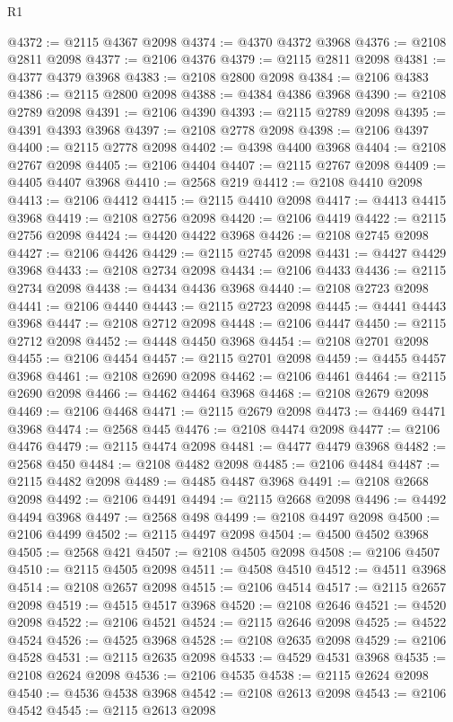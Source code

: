 \begin{lexlean}{R1}
\begin{coremodule}
@4372 := @2115 @4367 @2098
@4374 := @4370 @4372 @3968
@4376 := @2108 @2811 @2098
@4377 := @2106 @4376
@4379 := @2115 @2811 @2098
@4381 := @4377 @4379 @3968
@4383 := @2108 @2800 @2098
@4384 := @2106 @4383
@4386 := @2115 @2800 @2098
@4388 := @4384 @4386 @3968
@4390 := @2108 @2789 @2098
@4391 := @2106 @4390
@4393 := @2115 @2789 @2098
@4395 := @4391 @4393 @3968
@4397 := @2108 @2778 @2098
@4398 := @2106 @4397
@4400 := @2115 @2778 @2098
@4402 := @4398 @4400 @3968
@4404 := @2108 @2767 @2098
@4405 := @2106 @4404
@4407 := @2115 @2767 @2098
@4409 := @4405 @4407 @3968
@4410 := @2568 @219
@4412 := @2108 @4410 @2098
@4413 := @2106 @4412
@4415 := @2115 @4410 @2098
@4417 := @4413 @4415 @3968
@4419 := @2108 @2756 @2098
@4420 := @2106 @4419
@4422 := @2115 @2756 @2098
@4424 := @4420 @4422 @3968
@4426 := @2108 @2745 @2098
@4427 := @2106 @4426
@4429 := @2115 @2745 @2098
@4431 := @4427 @4429 @3968
@4433 := @2108 @2734 @2098
@4434 := @2106 @4433
@4436 := @2115 @2734 @2098
@4438 := @4434 @4436 @3968
@4440 := @2108 @2723 @2098
@4441 := @2106 @4440
@4443 := @2115 @2723 @2098
@4445 := @4441 @4443 @3968
@4447 := @2108 @2712 @2098
@4448 := @2106 @4447
@4450 := @2115 @2712 @2098
@4452 := @4448 @4450 @3968
@4454 := @2108 @2701 @2098
@4455 := @2106 @4454
@4457 := @2115 @2701 @2098
@4459 := @4455 @4457 @3968
@4461 := @2108 @2690 @2098
@4462 := @2106 @4461
@4464 := @2115 @2690 @2098
@4466 := @4462 @4464 @3968
@4468 := @2108 @2679 @2098
@4469 := @2106 @4468
@4471 := @2115 @2679 @2098
@4473 := @4469 @4471 @3968
@4474 := @2568 @445
@4476 := @2108 @4474 @2098
@4477 := @2106 @4476
@4479 := @2115 @4474 @2098
@4481 := @4477 @4479 @3968
@4482 := @2568 @450
@4484 := @2108 @4482 @2098
@4485 := @2106 @4484
@4487 := @2115 @4482 @2098
@4489 := @4485 @4487 @3968
@4491 := @2108 @2668 @2098
@4492 := @2106 @4491
@4494 := @2115 @2668 @2098
@4496 := @4492 @4494 @3968
@4497 := @2568 @498
@4499 := @2108 @4497 @2098
@4500 := @2106 @4499
@4502 := @2115 @4497 @2098
@4504 := @4500 @4502 @3968
@4505 := @2568 @421
@4507 := @2108 @4505 @2098
@4508 := @2106 @4507
@4510 := @2115 @4505 @2098
@4511 := @4508 @4510
@4512 := @4511 @3968
@4514 := @2108 @2657 @2098
@4515 := @2106 @4514
@4517 := @2115 @2657 @2098
@4519 := @4515 @4517 @3968
@4520 := @2108 @2646
@4521 := @4520 @2098
@4522 := @2106 @4521
@4524 := @2115 @2646 @2098
@4525 := @4522 @4524
@4526 := @4525 @3968
@4528 := @2108 @2635 @2098
@4529 := @2106 @4528
@4531 := @2115 @2635 @2098
@4533 := @4529 @4531 @3968
@4535 := @2108 @2624 @2098
@4536 := @2106 @4535
@4538 := @2115 @2624 @2098
@4540 := @4536 @4538 @3968
@4542 := @2108 @2613 @2098
@4543 := @2106 @4542
@4545 := @2115 @2613 @2098

\end{coremodule}
\end{lexlean}
